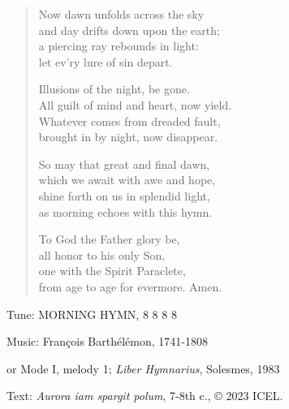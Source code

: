 \hymn

\begin{verse}
Now dawn unfolds across the sky\\
and day drifts down upon the earth;\\
a piercing ray rebounds in light:\\
let ev’ry lure of sin depart.

Illusions of the night, be gone.\\
All guilt of mind and heart, now yield.\\
Whatever comes from dreaded fault,\\
brought in by night, now disappear.

So may that great and final dawn,\\
which we await with awe and hope,\\
shine forth on us in splendid light,\\
as morning echoes with this hymn.

To God the Father glory be,\\
all honor to his only Son,\\
one with the Spirit Paraclete,\\
from age to age for evermore. Amen.
\end{verse}

\begin{hymnsource}
Tune: MORNING HYMN, 8 8 8 8

Music: François Barthélémon, 1741-1808

or Mode I, melody 1; \emph{Liber Hymnarius}, Solesmes, 1983

Text: \emph{Aurora iam spargit polum}, 7-8th c., © 2023 ICEL.
\end{hymnsource}

